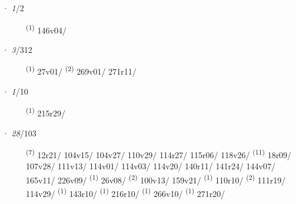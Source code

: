 \noindent{} · \textit{1}/2 \LEMMALINE
\begin{description}
    \item[]  \textsuperscript{(1)} \mbox{146v04/}
\end{description}
\ENTRYEND
\noindent{} · \textit{3}/312 \LEMMALINE
\begin{description}
    \item[]  \textsuperscript{(1)} \mbox{27v01/} \textsuperscript{(2)} \mbox{269v01/} \mbox{271r11/}
\end{description}
\ENTRYEND
\noindent{} · \textit{1}/10 \LEMMALINE
\begin{description}
    \item[]  \textsuperscript{(1)} \mbox{215r29/}
\end{description}
\ENTRYEND
\noindent{} · \textit{28}/103 \LEMMALINE
\begin{description}
    \item[]  \textsuperscript{(7)} \mbox{12r21/} \mbox{104v15/} \mbox{104v27/} \mbox{110v29/} \mbox{114r27/} \mbox{115r06/} \mbox{118v26/} \textsuperscript{(11)} \mbox{18r09/} \mbox{107v28/} \mbox{111v13/} \mbox{114v01/} \mbox{114v03/} \mbox{114v20/} \mbox{140r11/} \mbox{141r24/} \mbox{144v07/} \mbox{165v11/} \mbox{226v09/} \textsuperscript{(1)} \mbox{26v08/} \textsuperscript{(2)} \mbox{100v13/} \mbox{159v21/} \textsuperscript{(1)} \mbox{110r10/} \textsuperscript{(2)} \mbox{111r19/} \mbox{114v29/} \textsuperscript{(1)} \mbox{143r10/} \textsuperscript{(1)} \mbox{216r10/} \textsuperscript{(1)} \mbox{266v10/} \textsuperscript{(1)} \mbox{271r20/}
\end{description}
